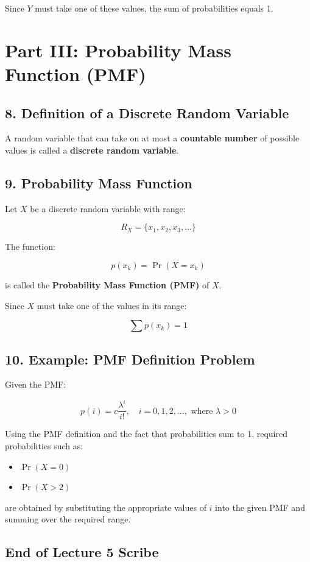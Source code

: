 \documentclass[12pt]{article}
\begin{document}
Since $Y$ must take one of these values, the sum of probabilities equals 1.

\hrulefill

\section*{Part III: Probability Mass Function (PMF)}

\subsection*{8. Definition of a Discrete Random Variable}

A random variable that can take on at most a \textbf{countable number} of possible values is called a \textbf{discrete random variable}.

\hrulefill

\subsection*{9. Probability Mass Function}

Let $X$ be a discrete random variable with range:

\[
R_X = \{x_1, x_2, x_3, \ldots\}
\]

The function:

\[
p(x_k) = \Pr(X = x_k)
\]

is called the \textbf{Probability Mass Function (PMF)} of $X$.

Since $X$ must take one of the values in its range:

\[
\sum p(x_k) = 1
\]

\hrulefill

\subsection*{10. Example: PMF Definition Problem}

Given the PMF:

\[
p(i) = c \frac{\lambda^i}{i!}, \quad i = 0, 1, 2, \ldots, \text{ where } \lambda > 0
\]

Using the PMF definition and the fact that probabilities sum to 1, required probabilities such as:

\begin{itemize}
    \item $\Pr(X = 0)$
    \item $\Pr(X > 2)$
\end{itemize}

are obtained by substituting the appropriate values of $i$ into the given PMF and summing over the required range.

\hrulefill

\subsection*{End of Lecture 5 Scribe}
\end{document}
